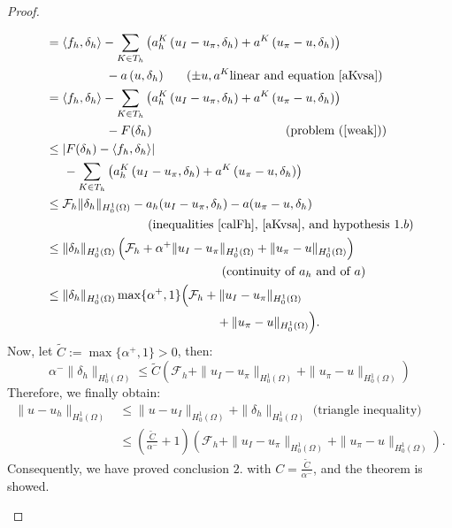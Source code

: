 \begin{proof}
\begin{enumerate}
\begin{align*}
&= \langle f_h, \delta_h\rangle - \sum_{K\in T_h}\left( a_h^K\left( u_I-u_\pi,\delta_h \right) + a^K\left( u_\pi-u, \delta_h \right) \right) \\
&\hspace{1.7cm}- a\left( u, \delta_h \right) \hspace{0.6cm} (\pm u, a^K \text{linear and equation \ref{aKvsa})}\\
&= \langle f_h, \delta_h\rangle - \sum_{K\in T_h}\left( a_h^K\left( u_I-u_\pi,\delta_h \right) + a^K\left( u_\pi-u, \delta_h \right) \right) \\
&\hspace{1.7cm}- F(\delta_h) \hspace{3.8cm}\text{(problem (\ref{weak}))}\\
&\leq |F(\delta_h) - \langle f_h, \delta_h \rangle| \\
&\hspace{0.5cm} - \sum_{K\in T_h}\left( a_h^K\left( u_I-u_\pi,\delta_h \right) + a^K\left( u_\pi-u, \delta_h \right) \right)\\
&\leq \mathcal{F}_h\|\delta_h\|_{H_0^1(\Omega)}-a_h(u_I-u_\pi,\delta_h)-a(u_\pi-u,\delta_h)\\
&\hspace{2.9cm} \text{(inequalities \ref{calFh}, \ref{aKvsa}, and hypothesis }1.b)\\
&\leq \|\delta_h\|_{H_0^1(\Omega)} \left (\mathcal{F}_h + \alpha^+\|u_I-u_\pi\|_{H_0^1(\Omega)} + \|u_\pi-u\|_{H_0^1(\Omega)} \right)\\
&\hspace{5cm} (\text{continuity of } a_h \text{ and of } a)\\
&\leq \|\delta_h\|_{H_0^1(\Omega)} \max\{\alpha^+,1\} \Big(\mathcal{F}_h + \|u_I-u_\pi\|_{H_0^1(\Omega)} \\
& \hspace{4.85cm} + \|u_\pi-u\|_{H_0^1(\Omega)} \Big).
\end{align*}
Now, let $\tilde{C} := \max\{\alpha^+,1\}>0$, then:
\begin{equation*}
\alpha^- \|\delta_h\|_{H_0^1(\Omega)}\leq \tilde{C}\left(\mathcal{F}_h + \|u_I-u_\pi\|_{H_0^1(\Omega)} + \|u_\pi-u\|_{H_0^1(\Omega)} \right)
\end{equation*}
Therefore, we finally obtain:
\begin{align*}
\|u-u_h\|_{H_0^1(\Omega)} &\leq \|u-u_I\|_{H_0^1(\Omega)} + \|\delta_h\|_{H_0^1(\Omega)} \text{ (triangle inequality)}\\ 
&\leq \left(\frac{\tilde{C}}{\alpha^-}+1\right)\left(\mathcal{F}_h + \|u_I-u_\pi\|_{H_0^1(\Omega)} + \|u_\pi-u\|_{H_0^1(\Omega)} \right).
\end{align*}
Consequently, we have proved conclusion $2.$ with $C=\frac{\tilde{C}}{\alpha^-}$, and the theorem is showed. 
\end{enumerate}
\end{proof}

